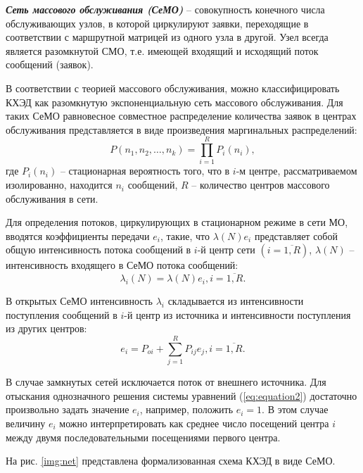 \vspace{\baselineskip}
\textbf{\textit{Сеть массового обслуживания (СеМО)}} -- совокупность конечного числа обслуживающих узлов, в которой циркулируют заявки, переходящие в соответствии с маршрутной матрицей из одного узла в другой. Узел всегда является разомкнутой СМО, т.е. имеющей входящий и исходящий поток сообщений (заявок).

\vspace{\baselineskip}
В соответствии с теорией массового обслуживания, можно классифицировать КХЭД как разомкнутую экспоненциальную сеть массового обслуживания. \cite{bib3} Для таких СеМО равновесное совместное распределение количества заявок в центрах обслуживания представляется в виде произведения маргинальных распределений:
\begin{equation}
  \label{eq:equation1}
  P(n_1,n_2,\ldots,n_k) = \prod_{i=1}^R P_i(n_i),
\end{equation}
где $P_i(n_i)$ -- стационарная вероятность того, что в $i$-м центре, рассматриваемом изолированно, находится  $n_i$ сообщений, $R$ -- количество центров массового обслуживания в сети.

\vspace{\baselineskip}
Для определения потоков, циркулирующих в стационарном режиме в сети МО, вводятся коэффициенты передачи  $e_i$, такие, что $\lambda(N)e_i$ представляет собой общую интенсивность потока сообщений в $i$-й центр сети $(i=\overline{1,R})$, $\lambda(N)$ -- интенсивность входящего в СеМО потока сообщений:
$$
\lambda_i(N)=\lambda(N)e_i, i=\overline{1,R}.
$$

В открытых СеМО интенсивность  $\lambda_i$ складывается из интенсивности поступления сообщений в $i$-й центр из источника и интенсивности поступления из других центров:
\begin{equation}
  \label{eq:equation2}
e_i = P_{oi} + \sum_{j=1}^R P_{ij}e_j, i=\overline{1,R}.
\end{equation}

В случае замкнутых сетей исключается поток от внешнего источника. Для отыскания однозначного решения системы уравнений (\ref{eq:equation2}) достаточно произвольно задать значение $e_i$, например, положить $e_i=1$. В этом случае величину $e_i$ можно интерпретировать как среднее число посещений центра $i$ между двумя последовательными посещениями первого центра.

\vspace{\baselineskip}
На рис. \ref{img:net} представлена формализованная схема КХЭД в виде СеМО.

